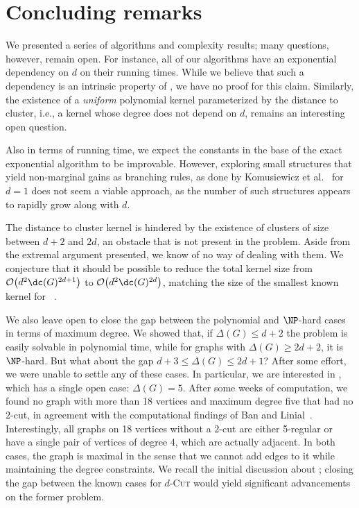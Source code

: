 \section{Concluding remarks}
\label{sec:concl}

We presented a series of algorithms and complexity results; many questions, however, remain open.
For instance, all of our algorithms have an exponential dependency on $d$ on their running times.
While we believe that such a dependency is an intrinsic property of , we have no proof for this claim. Similarly, the existence of a {\sl uniform} polynomial kernel parameterized by the distance to cluster, i.e., a kernel whose degree does not depend on $d$, remains an interesting open question.

Also in terms of running time, we expect the constants in the base of the exact exponential algorithm to be improvable. However, exploring small structures that yield non-marginal gains as branching rules, as done by Komusiewicz et al.~\cite{matching_cut_ipec} for $d=1$ does not seem a viable approach, as the number of such structures appears to rapidly grow along with $d$.



The distance to cluster kernel is hindered by the existence of clusters of size between $d+2$ and $2d$, an obstacle that is not present in the  problem.
Aside from the extremal argument presented, we know of no way of dealing with them.
We conjecture that it should be possible to reduce the total kernel size from $\bigO{d^2\dc(G)^{2d+1}}$ to $\bigO{d^2\dc(G)^{2d}}$, matching the size of the smallest known kernel for ~\cite{matching_cut_ipec}.

We also leave open to close the gap between the polynomial and $\NP$-hard cases in terms of maximum degree.
We showed that, if $\Delta(G) \leq d+2$ the problem is easily solvable in polynomial time, while for graphs with $\Delta(G) \geq 2d+2$, it is $\NP$-hard.
But what about the gap $d+3 \leq \Delta(G) \leq 2d+1$?
After some effort, we were unable to settle any of these cases.
In particular, we are interested in ,  which has a single open case: $\Delta(G) = 5$.
After some weeks of computation, we found no graph with more than 18 vertices and maximum degree five that had no $2$-cut, in agreement with the computational findings of Ban and Linial~\cite{internal_partition_regular6}.
Interestingly, all graphs on 18 vertices without a $2$-cut are either 5-regular or have a single pair of vertices of degree 4, which are actually adjacent.
In both cases, the graph is maximal in the sense that we cannot add edges to it while maintaining the degree constraints.
We recall the initial discussion about ; closing the gap between the known cases for \textsc{$d$-Cut} would yield significant advancements on the former problem.

